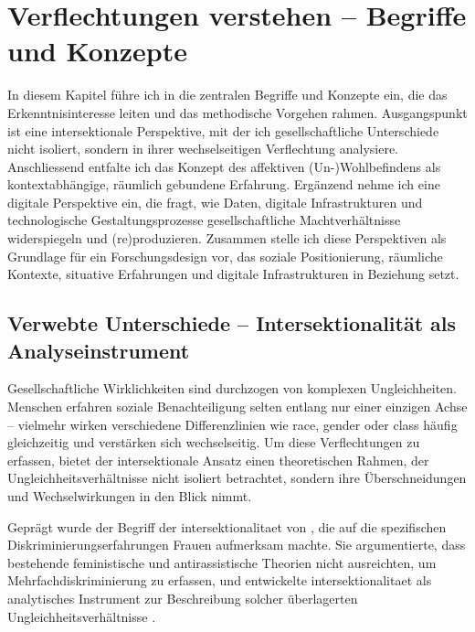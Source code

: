
\chapter{Verflechtungen verstehen -- Begriffe und Konzepte} \label{sec:theoretischer_rahmen}

In diesem Kapitel führe ich in die zentralen Begriffe und Konzepte ein, die das Erkenntnisinteresse leiten und das methodische Vorgehen rahmen. Ausgangspunkt ist eine intersektionale Perspektive, mit der ich gesellschaftliche Unterschiede nicht isoliert, sondern in ihrer wechselseitigen Verflechtung analysiere. Anschliessend entfalte ich das Konzept des affektiven (Un-)Wohlbefindens als kontextabhängige, räumlich gebundene Erfahrung. Ergänzend nehme ich eine digitale Perspektive ein, die fragt, wie Daten, digitale Infrastrukturen und technologische Gestaltungsprozesse gesellschaftliche Machtverhältnisse widerspiegeln und (re)produzieren. Zusammen stelle ich diese Perspektiven als Grundlage für ein Forschungsdesign vor, das soziale Positionierung, räumliche Kontexte, situative Erfahrungen und digitale Infrastrukturen in Beziehung setzt.

\section{Verwebte Unterschiede -- Intersektionalität als Analyseinstrument}

Gesellschaftliche Wirklichkeiten sind durchzogen von komplexen Ungleichheiten. Menschen erfahren soziale Benachteiligung selten entlang nur einer einzigen Achse -- vielmehr wirken verschiedene Differenzlinien wie \gls{race}, \gls{gender} oder \gls{class} häufig gleichzeitig und verstärken sich wechselseitig. Um diese Verflechtungen zu erfassen, bietet der intersektionale Ansatz einen theoretischen Rahmen, der Ungleichheitsverhältnisse nicht isoliert betrachtet, sondern ihre Überschneidungen und Wechselwirkungen in den Blick nimmt.

Geprägt wurde der Begriff der \gls{intersektionalitaet} von \textcite{crenshawMappingMarginsIntersectionality1991}, die auf die spezifischen Diskriminierungserfahrungen \emph{}\footnotemark Frauen aufmerksam machte. Sie argumentierte, dass bestehende feministische und antirassistische Theorien nicht ausreichten, um Mehrfachdiskriminierung zu erfassen, und entwickelte \gls{intersektionalitaet} als analytisches Instrument zur Beschreibung solcher überlagerten Ungleichheitsverhältnisse \parencite[\gls{vgl}][]{hancockWhenMultiplicationDoesnt2007}.

